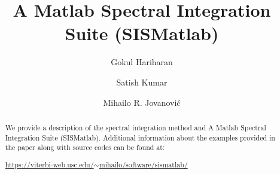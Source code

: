 \documentclass[%
secnumarabic,%
 amssymb, amsmath,%
 aps,prf,superscriptaddress,longbibliography
frontmatterverbose,
]{revtex4-2}
\begin{document}
\title{\bf \large A Matlab Spectral Integration Suite (SISMatlab)}


\author{Gokul Hariharan}
\author{Satish Kumar}
\author{Mihailo R. Jovanovi\'c}



\newcommand{\D}{\mathrm D}
\newcommand{\I}{\mathbf I}
\newcommand{\J}{\mathbf J}
\newcommand{\K}{\mathbf K}
\newcommand{\E}{\mathbf E}
\newcommand{\0}{\mathbf 0}
\newcommand{\T}{\mathbf T}
\newcommand{\R}{\mathbf R}
\newcommand{\DD}[2]{\frac{\partial^2 #1}{\partial #2^2}}
\newcommand{\BB}[1]{\boldsymbol #1}
\newcommand{\hh}[1]{\mathbf{\bar{\text{$#1$}}}}
\newcommand{\HH}[1]{\mathbf{#1}}
\newcommand{\MM}[1]{\mathcal{#1}}
\newcommand{\MMbf}[1]{\mathbfcal{#1}}
\pagebreak

\begin{abstract}
We provide a description of the spectral integration method and A Matlab Spectral Integration Suite ({\sf SISMatlab}). Additional information about the examples provided in the paper along with source codes can be found at: 
	\vspace*{0.15cm}
	\begin{center}
	\href{https://viterbi-web.usc.edu/~mihailo/software/sismatlab/}{https://viterbi-web.usc.edu/$\sim$mihailo/software/sismatlab/}
	\end{center}
	\end{abstract}
\end{document}
